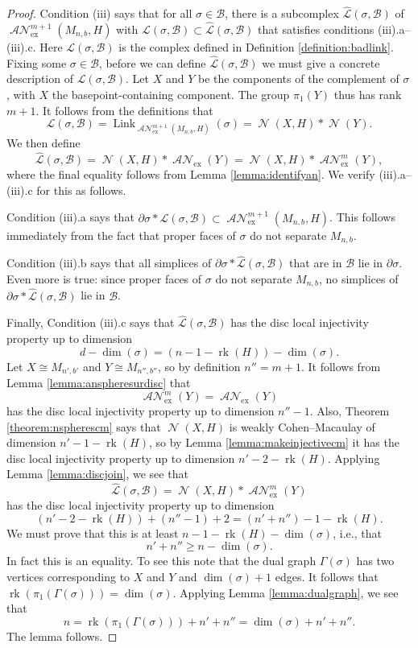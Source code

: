 \documentclass[11pt]{amsart}
\numberwithin{equation}{section}
\theoremstyle{plain}
\theoremstyle{definition}
\theoremstyle{remark}
\DeclareMathOperator{\rank}{rk}
\newcommand\cB{\ensuremath{\mathcal{B}}}
\newcommand\cL{\ensuremath{\mathcal{L}}}
\newcommand\hcL{\ensuremath{\widehat{\cL}}}
\DeclareMathOperator{\NSpheres}{\mathcal{N}}
\DeclareMathOperator{\ANSpheres}{\mathcal{AN}}
\newcommand\ANSpheresEX{\ANSpheres_{\text{ex}}}
\DeclareMathOperator{\Link}{Link}
\begin{document}
\begin{proof}
Condition (iii) says that for all $\sigma \in \cB$, there is a subcomplex $\hcL(\sigma,\cB)$ of
$\ANSpheresEX^{m+1}(M_{n,b},H)$ with $\cL(\sigma,\cB) \subset \hcL(\sigma,\cB)$ that satisfies conditions
(iii).a--(iii).c.  Here $\cL(\sigma,\cB)$ is the complex defined in Definition \ref{definition:badlink}.
Fixing some $\sigma \in \cB$, before we can define $\hcL(\sigma,\cB)$ we must give a concrete
description of $\cL(\sigma,\cB)$.  Let $X$ and $Y$ be the components of the complement of
$\sigma$, with $X$ the basepoint-containing component.  The group $\pi_1(Y)$ thus has rank $m+1$.
It follows from the definitions that
\[\cL(\sigma,\cB) = \Link_{\ANSpheresEX^{m+1}(M_{n,b},H)}(\sigma) = \NSpheres(X,H) \ast \NSpheres(Y).\]
We then define
\[\hcL(\sigma,\cB) = \NSpheres(X,H) \ast \ANSpheresEX(Y) = \NSpheres(X,H) \ast \ANSpheresEX^m(Y),\]
where the final equality follows from Lemma \ref{lemma:identifyan}.
We verify (iii).a--(iii).c for this as follows.

Condition (iii).a says that
$\partial \sigma \ast \hcL(\sigma,\cB) \subset \ANSpheresEX^{m+1}(M_{n,b},H)$.  This follows
immediately from the fact that proper faces of $\sigma$ do not separate $M_{n,b}$.

Condition (iii).b says that all simplices of $\partial \sigma \ast \hcL(\sigma,\cB)$ that are in $\cB$
lie in $\partial \sigma$.  Even more is true: since proper faces of $\sigma$ do not separate
$M_{n,b}$, no simplices of $\partial \sigma \ast \hcL(\sigma,\cB)$ lie in $\cB$.

Finally, Condition (iii).c says that $\hcL(\sigma,\cB)$ has the disc local injectivity
property up to dimension
\[d - \dim(\sigma) = (n-1-\rank(H)) - \dim(\sigma).\]
Let $X \cong M_{n',b'}$ and $Y \cong M_{n'',b''}$, so by definition $n'' = m+1$.  It follows from Lemma \ref{lemma:anspheresurdisc}
that
\[\ANSpheresEX^m(Y) = \ANSpheresEX(Y)\]
has the disc local injectivity property up to
dimension $n''-1$.  Also, Theorem \ref{theorem:nspherescm} says that $\NSpheres(X,H)$
is weakly Cohen--Macaulay of dimension $n'-1-\rank(H)$, so by Lemma \ref{lemma:makeinjectivecm}
it has the disc local injectivity property up to dimension $n'-2-\rank(H)$.  
Applying Lemma \ref{lemma:discjoin}, we see that
\[\hcL(\sigma,\cB) = \NSpheres(X,H) \ast \ANSpheresEX^m(Y)\]
has the disc local injectivity property up to dimension
\[(n'-2-\rank(H)) + (n''-1)+2 = (n'+n'') - 1 -\rank(H).\]
We must prove that this is at least $n-1-\rank(H)-\dim(\sigma)$, i.e., that
\[n'+n'' \geq n - \dim(\sigma).\]
In fact this is an equality.  To see this note that 
the dual graph $\Gamma(\sigma)$ has two vertices corresponding to $X$ and $Y$ and
$\dim(\sigma)+1$ edges.  It follows that $\rank(\pi_1(\Gamma(\sigma))) = \dim(\sigma)$.  Applying
Lemma \ref{lemma:dualgraph}, we see that
\[n = \rank(\pi_1(\Gamma(\sigma))) + n' + n'' = \dim(\sigma) + n' + n''.\]
The lemma follows.
\end{proof}
\end{document}

